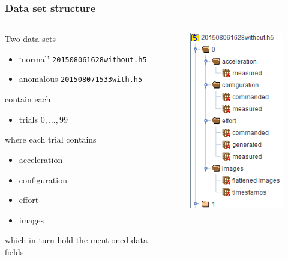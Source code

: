 \documentclass[%
USenglish,%
pdftex,%
compress,%
10pt,%
svgnames%
,handout
]
{beamer}
\begin{document}
\begin{frame}
	\frametitle{Data set structure}
    \begin{columns}[onlytextwidth]
        \begin{column}{.6\textwidth}
            Two data sets
            \begin{itemize}
                \item `normal' \texttt{201508061628without.h5}
                \item anomalous \texttt{201508071533with.h5}
            \end{itemize}
            contain each
            \begin{itemize}
                \item trials $0, \ldots, 99$
            \end{itemize}
            where each trial contains
            \begin{itemize}
                \item acceleration
                \item configuration
                \item effort
                \item images
            \end{itemize}
            which in turn hold the mentioned data fields
        \end{column}
        \begin{column}{.4\textwidth}
            \begin{figure}
                \centering
                \includegraphics[width=.7\columnwidth]{figs/h5}

\end{figure}
\end{column}
\end{columns}
\end{frame}
\end{document}
